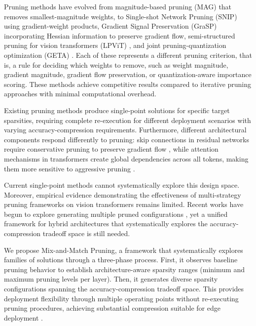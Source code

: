 \documentclass[11pt, conference]{IEEEtran}
\begin{document}
Pruning methods have evolved from magnitude-based pruning (MAG) \cite{han2015learning} that removes smallest-magnitude weights, to Single-shot Network Pruning (SNIP) \cite{lee2018snip} using gradient-weight products, Gradient Signal Preservation (GraSP) \cite{wang2020picking} incorporating Hessian information to preserve gradient flow, semi-structured pruning for vision transformers (LPViT) \cite{wu2025lpvit}, and joint pruning-quantization optimization (GETA) \cite{geta2025}. Each of these represents a different pruning criterion, that is, a rule for deciding which weights to remove, such as weight magnitude, gradient magnitude, gradient flow preservation, or quantization-aware importance scoring. These methods achieve competitive results compared to iterative pruning approaches with minimal computational overhead.

Existing pruning methods produce single-point solutions for specific target sparsities, requiring complete re-execution for different deployment scenarios with varying accuracy-compression requirements. Furthermore, different architectural components respond differently to pruning: skip connections in residual networks require conservative pruning to preserve gradient flow \cite{li2017pruning}, while attention mechanisms in transformers create global dependencies across all tokens, making them more sensitive to aggressive pruning \cite{rao2021dynamicvit}.

Current single-point methods cannot systematically explore this design space. Moreover, empirical evidence demonstrating the effectiveness of multi-strategy pruning frameworks on vision transformers remains limited. Recent works have begun to explore generating multiple pruned configurations \cite{lee2024mpruner, desai2024llamaflex}, yet a unified framework for hybrid architectures that systematically explores the accuracy-compression tradeoff space is still needed.

We propose Mix-and-Match Pruning, a framework that systematically explores families of solutions through a three-phase process. First, it observes baseline pruning behavior to establish architecture-aware sparsity ranges (minimum and maximum pruning levels per layer). Then, it generates diverse sparsity configurations spanning the accuracy-compression tradeoff space. This provides deployment flexibility through multiple operating points without re-executing pruning procedures, achieving substantial compression suitable for edge deployment \cite{wu2025lpvit}.
\end{document}
